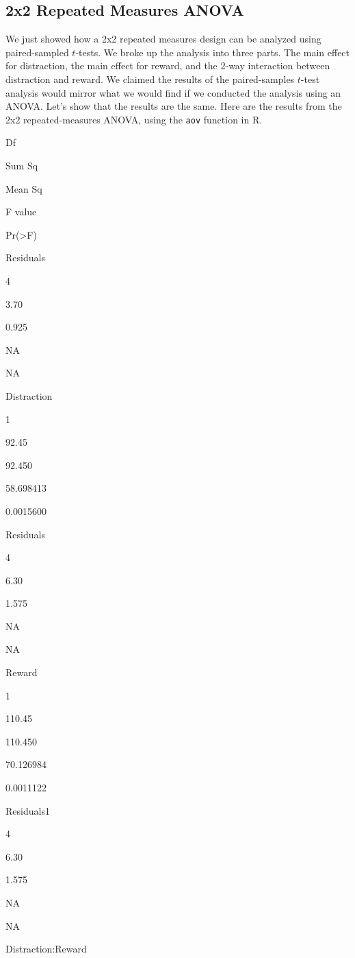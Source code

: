 \documentclass[
]{book}
\begin{document}
\hypertarget{x2-repeated-measures-anova}{%
\subsection{2x2 Repeated Measures ANOVA}\label{x2-repeated-measures-anova}}

We just showed how a 2x2 repeated measures design can be analyzed using paired-sampled \(t\)-tests. We broke up the analysis into three parts. The main effect for distraction, the main effect for reward, and the 2-way interaction between distraction and reward. We claimed the results of the paired-samples \(t\)-test analysis would mirror what we would find if we conducted the analysis using an ANOVA. Let's show that the results are the same. Here are the results from the 2x2 repeated-measures ANOVA, using the \texttt{aov} function in R.

Df

Sum Sq

Mean Sq

F value

Pr(\textgreater F)

Residuals

4

3.70

0.925

NA

NA

Distraction

1

92.45

92.450

58.698413

0.0015600

Residuals

4

6.30

1.575

NA

NA

Reward

1

110.45

110.450

70.126984

0.0011122

Residuals1

4

6.30

1.575

NA

NA

Distraction:Reward
\end{document}
